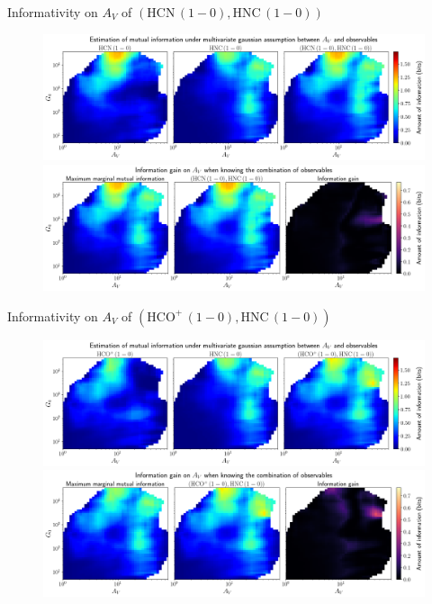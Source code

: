 \documentclass{beamer}
\begin{document}
\begin{frame}{Informativity on $A_V$ of $\left(\mathrm{HCN\,(1-0)},\mathrm{HNC\,(1-0)}\right)$}
    \begin{figure}
        \centering
        \includegraphics[width=0.95\linewidth]{../linearinfo/av__hcn10_hnc10_linearinfo.png}
        \vfill
        \includegraphics[width=0.95\linewidth]{../linearinfo/av__hcn10_hnc10_linearinfo_gain.png}
    \end{figure}
\end{frame}

\begin{frame}{Informativity on $A_V$ of $\left(\mathrm{HCO^+\,(1-0)},\mathrm{HNC\,(1-0)}\right)$}
    \begin{figure}
        \centering
        \includegraphics[width=0.95\linewidth]{../linearinfo/av__hcop10_hnc10_linearinfo.png}
        \vfill
        \includegraphics[width=0.95\linewidth]{../linearinfo/av__hcop10_hnc10_linearinfo_gain.png}
    \end{figure}
\end{frame}
\end{document}
